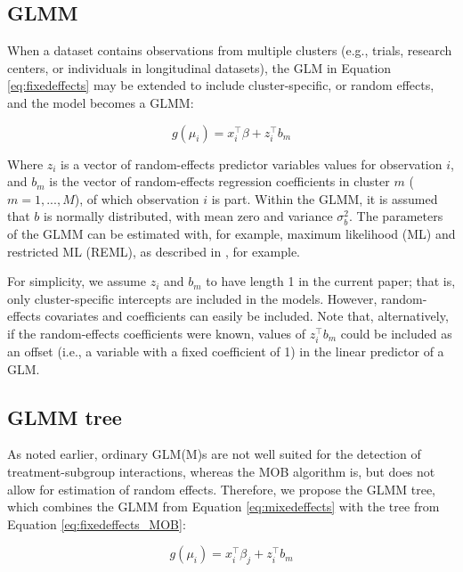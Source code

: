 \documentclass[nobf,doc]{apa}
\begin{document}
\subsection{GLMM}
When a dataset contains observations from multiple clusters (e.g., trials, research centers, or individuals in longitudinal datasets), the GLM in Equation \ref{eq:fixedeffects} may be extended to include cluster-specific, or random effects, and the model becomes a GLMM:

\begin{equation}
\label{eq:mixedeffects}
	g(\mu_{i}) = x_{i}^{\top}\beta + z_{i}^{\top}b_{m}
\end{equation}

Where $z_{i}$ is a vector of random-effects predictor variables values for observation $i$, and $b_{m}$ is the vector of random-effects regression coefficients in cluster $m$ ($m=1,...,M$), of which observation $i$ is part. Within the GLMM, it is assumed that $b$ is normally distributed, with mean zero and variance $\sigma^{2}_{b}$. The parameters of the GLMM can be estimated with, for example, maximum likelihood (ML) and restricted ML (REML), as described in , for example.  

For simplicity, we assume $z_{i}$ and $b_{m}$ to have length 1 in the current paper; that is, only cluster-specific intercepts are included in the models. However, random-effects covariates and coefficients can easily be included. Note that, alternatively, if the random-effects coefficients were known, values of $z_{i}^{\top}b_{m}$ could be included as an offset (i.e., a variable with a fixed coefficient of 1) in the linear predictor of a GLM.



\subsection{GLMM tree}

As noted earlier, ordinary GLM(M)s are not well suited for the detection of treatment-subgroup interactions, whereas the MOB algorithm is, but does not allow for estimation of random effects. Therefore, we propose the GLMM tree, which combines the GLMM from Equation \ref{eq:mixedeffects} with the tree from Equation \ref{eq:fixedeffects_MOB}: 

\begin{equation}
\label{eq:glimmertree}
	g(\mu_{i}) = x_{i}^{\top}\beta_{j} + z_{i}^{\top}b_{m}
\end{equation}
\end{document}
